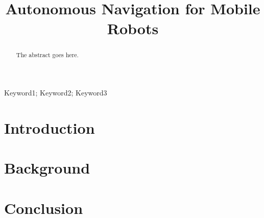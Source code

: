 \documentclass[conference, letterpaper]{IEEEtran}
\begin{document}
\title{Autonomous Navigation for Mobile Robots}

\author{
}

\maketitle

\begin{abstract}
The abstract goes here.
\end{abstract}

\begin{IEEEkeywords}
Keyword1; Keyword2; Keyword3
\end{IEEEkeywords}

\IEEEpeerreviewmaketitle

\section{Introduction}

\section{Background}

\section{Conclusion}

\nocite{*}


\end{document}
